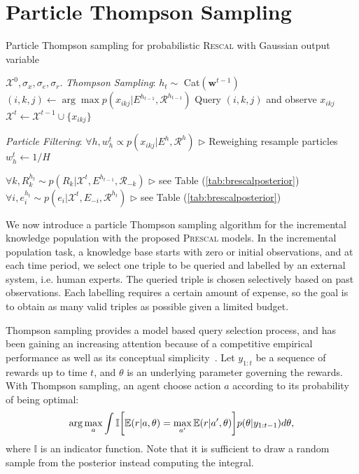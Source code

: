 \section{Particle Thompson Sampling}
\label{sec:pts}

\begin{algorithm}[t!]
   \caption{Particle Thompson sampling for probabilistic \textsc{Rescal} with Gaussian output variable}
   \label{alg:smc}
\begin{algorithmic}
    $\mathcal{X}^{0}, \sigma_x, \sigma_e, \sigma_r$.
   \STATE \textit{Thompson Sampling}:
   \STATE $h_t \sim $ Cat$(\mathbf{w}^{t-1})$
   \STATE $(i,k,j) \leftarrow \arg\max p(x_{ikj}| E^{h_{t-1}}, \mathcal{R}^{h_{t-1}})$
   \STATE Query $(i,k,j)$ and observe $x_{ikj}$
   \STATE $\mathcal{X}^{t} \leftarrow \mathcal{X}^{t-1} \cup \{x_{ikj}\}$

   \STATE \textit{Particle Filtering}:
   \STATE $\forall h, w_h^{t} \propto p(x_{ikj} | E^{h}, \mathcal{R}^{h})$   \hfill $\triangleright$ Reweighing
   \STATE resample particles
   \STATE $w_h^{t} \leftarrow 1/H$
   \ENDIF

   \STATE $\forall k, R_k^{h_t} \sim p(R_k | \mathcal{X}^{t}, E^{h_{t-1}}, \mathcal{R}_{-k})$   \hfill $\triangleright$ see Table (\ref{tab:brescalposterior})
   \STATE $\forall i, e^{h_t}_i \sim p(e_i | \mathcal{X}^{t}, E_{-i}, \mathcal{R}^{h_{t}})$ \hfill $\triangleright$ see Table (\ref{tab:brescalposterior})
   \ENDFOR

   \ENDFOR
\end{algorithmic}
\end{algorithm}

We now introduce a particle Thompson sampling algorithm for the incremental knowledge population with the proposed \textsc{Prescal} models. In the incremental population task, a knowledge base starts with zero or initial observations, and at each time period, we select one triple to be queried and labelled by an external system, i.e. human experts. The queried triple is chosen selectively based on past observations. Each labelling requires a certain amount of expense, so the goal is to obtain as many valid triples as possible given a limited budget.

Thompson sampling provides a model based query selection process, and has been gaining an increasing attention
because of a competitive empirical performance as well as its conceptual
simplicity~\cite{li11thompson,scott10bandit}. Let $y_{1:t}$ be a sequence of rewards up to time $t$, and $\theta$ is an underlying parameter governing the rewards. With Thompson sampling, an agent choose action $a$ according to its probability of being optimal:
\begin{align}
\arg\max_a \int \mathbb{I}\bigg[ \mathbb{E}(r|a, \theta)
= \max_{a'}\mathbb{E}(r|a',\theta) \bigg] p(\theta|y_{1:t-1}) d\theta, \notag
\end{align}
where $\mathbb{I}$ is an indicator function. Note that it is sufficient
to draw a random sample from the posterior instead computing the integral.

